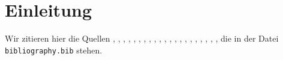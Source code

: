 \chapter{Einleitung}\label{sec:Introduction}
Wir zitieren hier die Quellen \cite{Agarwal2006}, \cite{Ahlgren2012}, \cite{Bayardo2007}, \cite{Broder2004}, \cite{Byers2002}, \cite{Duerr2010}, \cite{Hellerstein1994}, \cite{Lehman1986}, \cite{Mitzenmacher2002}, \cite{Nafe2005}, \cite{Qiao2014}, \cite{Ruppel2014}, \cite{Sakuma2011}, \cite{Sarwat2012}, \cite{Schnell2013}, \cite{Schoenfeld2014}, \cite{Shiraki2009}, \cite{Werner2015}, \cite{Yang2002}, \cite{Zhang2012}, \cite{Zhu2004}, die in der Datei\\
\verb|bibliography.bib|
stehen.
